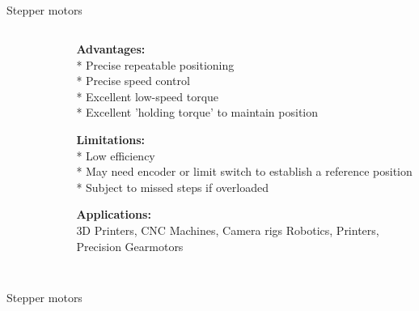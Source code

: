 \subsection{}
{
\begin{frame}{Stepper motors}

\begin{columns}
\begin{column}{0.45\textwidth}  %

	\vspace{-3mm}
   	\begin{figure}
 	\end{figure}

\end{column}

\begin{column}{0.55\textwidth}

{\bf Advantages:} \\
* Precise repeatable positioning \\
* Precise speed control \\
* Excellent low-speed torque \\
* Excellent 'holding torque' to maintain position


{\bf Limitations:} \\
* Low efficiency \\
* May need encoder or limit switch to establish a reference position \\
* Subject to missed steps if overloaded


{\bf Applications:} \\
3D Printers, 
CNC Machines, 
Camera rigs Robotics, 
Printers, 
Precision Gearmotors






\end{column}
\end{columns}
\end{frame}
}


\subsection{}
{
\begin{frame}{Stepper motors}

	\vspace{-3mm}
   	\begin{figure}
 	\end{figure}

\end{frame}
}



